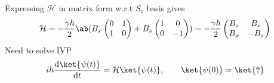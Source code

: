 \documentclass[12pt]{article}
\newcommand{\HH}{\mathcal{H}}
\begin{document}
\begin{ans}
Expressing $\HH$ in matrix form w.r.t $S_z$ basis gives
    \[\HH = -\frac{\gamma \hbar}{2}\ab(B_x\begin{pmatrix}
        0 & 1 \\ 
        1 & 0 \\
    \end{pmatrix} + B_z\begin{pmatrix}
        1 & 0 \\ 
        0 & -1 \\
    \end{pmatrix}) = -\frac{\gamma \hbar}{2}\begin{pmatrix}
        B_z & B_x \\ 
        B_x & -B_z \\
    \end{pmatrix}\]
    Need to solve IVP 
    \[
    i\hbar \odv{\ket{\psi(t)}}{t} = \HH \ket{\psi(t)}, \qquad \ket{\psi(0)} = \ket{\uparrow}
    \]


\end{ans}
\end{document}
